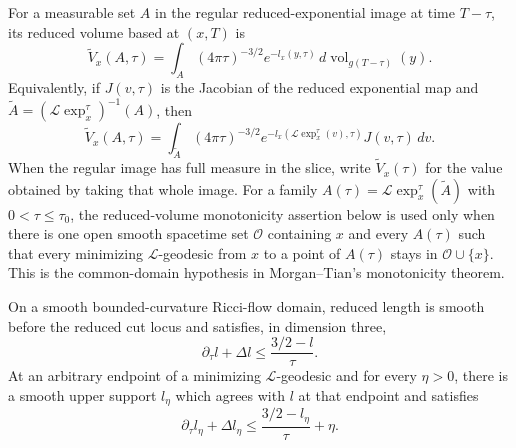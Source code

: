 \begin{definition}
\label{def:reduced-volume}
\notready
For a measurable set $A$ in the regular reduced-exponential image at time
$T-\tau$, its reduced volume based at $(x,T)$ is
\[
 \widetilde V_x(A,\tau)=
 \int_A(4\pi\tau)^{-3/2}e^{-l_x(y,\tau)}
 \,d\operatorname{vol}_{g(T-\tau)}(y).
\]
Equivalently, if $J(v,\tau)$ is the Jacobian of the reduced exponential map
and $\widetilde A=(\mathcal L\exp_x^\tau)^{-1}(A)$, then
\[
 \widetilde V_x(A,\tau)=
 \int_{\widetilde A}(4\pi\tau)^{-3/2}
 e^{-l_x(\mathcal L\exp_x^\tau(v),\tau)}J(v,\tau)\,dv.
\]
When the regular image has full measure in the slice, write
$\widetilde V_x(\tau)$ for the value obtained by taking that whole image.
For a family $A(\tau)=\mathcal L\exp_x^\tau(\widetilde A)$ with
$0<\tau\le\tau_0$, the reduced-volume monotonicity assertion below is used
only when there is one open smooth spacetime set $\mathcal O$ containing
$x$ and every $A(\tau)$ such that every minimizing $\mathcal L$-geodesic
from $x$ to a point of $A(\tau)$ stays in $\mathcal O\cup\{x\}$.
This is the common-domain hypothesis in Morgan--Tian's monotonicity theorem.
\end{definition}

\begin{lemma}
\label{lem:reduced-length-support-inequality}
\notready
On a smooth bounded-curvature Ricci-flow domain, reduced length is smooth
before the reduced cut locus and satisfies, in dimension three,
\[
 \partial_\tau l+\Delta l\le \frac{3/2-l}{\tau}.
\]
At an arbitrary endpoint of a minimizing $\mathcal L$-geodesic and for every
$\eta>0$, there is a smooth upper support $l_\eta$ which agrees with $l$ at
that endpoint and satisfies
\[
 \partial_\tau l_\eta+\Delta l_\eta
 \le \frac{3/2-l_\eta}{\tau}+\eta.
\]
\end{lemma}

